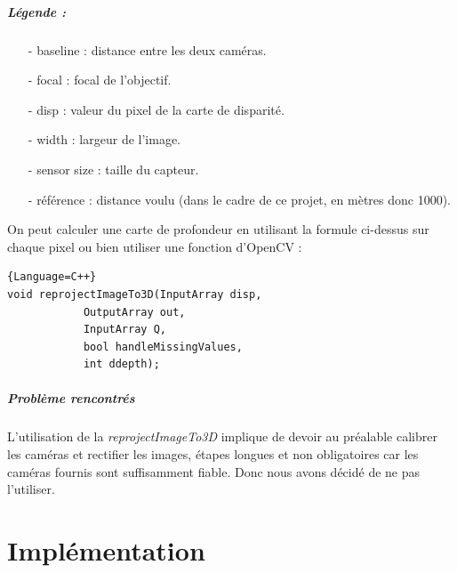 \documentclass[12pt,a4paper]{report}
\begin{document}
\paragraph{Légende : }
\begin{small}
\begin{enumerate}
\item[-] baseline : distance entre les deux caméras.\\
\item[-] focal : focal de l'objectif.\\
\item[-] disp : valeur du pixel de la carte de disparité.\\
\item[-] width : largeur de l'image.\\
\item[-] sensor size : taille du capteur.\\
\item[-] référence : distance voulu (dans le cadre de ce projet, en mètres donc 1000).\\
\end{enumerate}
\end{small}

On peut calculer une carte de profondeur en utilisant la formule ci-dessus sur chaque pixel ou bien utiliser une fonction d'OpenCV :  

\begin{lstlisting}{Language=C++}
void reprojectImageTo3D(InputArray disp, 
			OutputArray out, 
			InputArray Q, 
			bool handleMissingValues, 
			int ddepth);
\end{lstlisting}

\paragraph{Problème rencontrés}
L'utilisation de la \textit{reprojectImageTo3D} implique de devoir au préalable calibrer les caméras et rectifier les images, étapes longues et non obligatoires car les caméras fournis sont suffisamment fiable. Donc nous avons décidé de ne pas l'utiliser.

\chapter{Implémentation}
\end{document}
